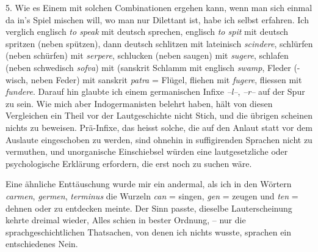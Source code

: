 {5. Wie es Einem mit solchen Combinationen ergehen kann, wenn man sich einmal da in’s Spiel mischen will, wo man nur Dilettant ist, habe ich selbst erfahren. Ich verglich englisch \textit{to speak} mit deutsch sprechen, englisch \textit{to spit} mit deutsch spritzen (neben spützen), dann deutsch schlitzen mit lateinisch \textit{scin}\label{sp.292}\textit{dere}, schlürfen (neben schürfen) mit \textit{serpere}, schlucken (neben saugen) mit \textit{sugere}, schlafen (neben schwedisch \textit{sofva}) mit  (sanskrit  Schlamm mit englisch \textit{swamp}, Fleder (-wisch, neben Feder) mit sanskrit \textit{patra} = Flügel, fliehen mit \textit{fugere}, fliessen mit \textit{fundere}. Darauf hin glaubte ich einem germanischen Infixe \textit{–l–}, \textit{–r–} auf der Spur zu sein. Wie mich aber Indogermanisten belehrt haben, hält von diesen Vergleichen ein Theil vor der Lautgeschichte nicht Stich, und die übrigen scheinen nichts zu beweisen. Prä-Infixe, das heisst solche, die auf den Anlaut  statt vor dem Auslaute eingeschoben zu werden, sind ohnehin in suffigirenden Sprachen nicht zu vermuthen, und unorganische Einschiebsel würden eine lautgesetzliche oder psychologische Erklärung erfordern, die erst noch zu suchen wäre. 

Eine ähnliche Enttäuschung wurde mir ein andermal, als ich in den Wörtern \textit{carmen}, \textit{germen}, \textit{terminus} die Wurzeln \textit{can} = singen, \textit{gen} = zeugen und \textit{ten} = dehnen oder  zu entdecken meinte. Der Sinn \label{fp.287} passte, dieselbe Lauterscheinung kehrte dreimal wieder, Alles schien in bester Ordnung, – nur die sprachgeschichtlichen Thatsachen, von denen ich nichts wusste, sprachen ein entschiedenes Nein.

}
